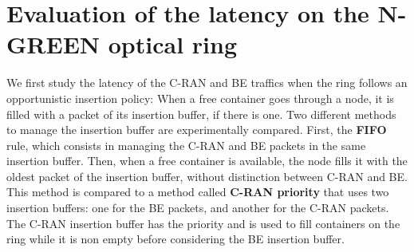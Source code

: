 \documentclass[10pt, conference, letterpaper]{IEEEtran}
\begin{document}
   \section{Evaluation of the latency on the N-GREEN optical ring}
   \label{sec:oportmethods}
   
   
  We first study the latency of the C-RAN and BE traffics when the ring follows an opportunistic insertion policy: When a free container goes through a node, it is filled with a packet of its insertion buffer, if there is one.
 Two different methods to manage the insertion buffer are experimentally compared. First, the \textbf{FIFO} rule, which consists in managing the C-RAN and BE packets in the same insertion buffer. Then, when a free container is available, the node fills it with the oldest packet of the insertion buffer, without distinction between C-RAN and BE. This method is compared to a method called \textbf{C-RAN priority} that uses two insertion buffers: one for the BE packets, and another for the C-RAN packets. The C-RAN insertion buffer has the priority and is used to fill containers on the ring while it is non empty before considering the BE insertion buffer.  
 
\end{document}
